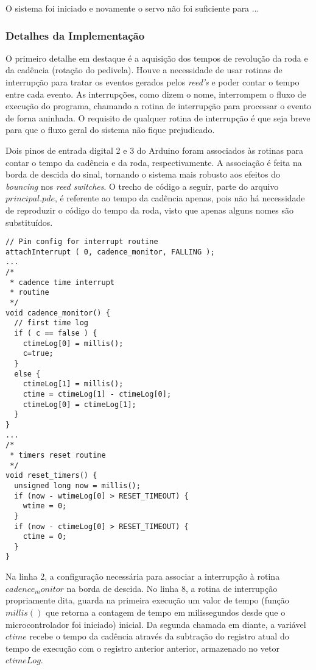 \documentclass[a4paper,11pt]{article}
\begin{document}
O sistema foi iniciado e novamente o servo não foi suficiente para ...

\subsubsection{Detalhes da Implementação}
\label{sec:code_detail}
O primeiro detalhe em destaque é a aquisição dos tempos de revolução da roda e
da cadência (rotação do pedivela). Houve a necessidade de usar rotinas de
interrupção para tratar os eventos gerados pelos \textit{reed's} e poder contar
o tempo entre cada evento. As interrupções, como dizem o nome, interrompem o
fluxo de execução do programa, chamando a rotina de interrupção para processar
o evento de forna aninhada. O requisito de qualquer rotina de interrupção é que
seja breve para que o fluxo geral do sistema não fique prejudicado.

Dois pinos de entrada digital 2 e 3 do Arduino foram associados às
rotinas para contar o tempo da cadência e da roda, respectivamente. A
associação é feita na borda de descida do sinal, tornando o sistema mais
robusto aos efeitos do \textit{bouncing} nos \textit{reed switches}. O
trecho de código a seguir, parte do arquivo $principal.pde$, é referente ao
tempo da cadência apenas, pois não há necessidade de reproduzir o código do
tempo da roda, visto que apenas alguns nomes são substituídos.
\begin{lstlisting}
// Pin config for interrupt routine
attachInterrupt ( 0, cadence_monitor, FALLING );
...
/*
 * cadence time interrupt
 * routine
 */
void cadence_monitor() {
  // first time log
  if ( c == false ) {
    ctimeLog[0] = millis();
    c=true;
  }
  else {
    ctimeLog[1] = millis();
    ctime = ctimeLog[1] - ctimeLog[0];
    ctimeLog[0] = ctimeLog[1];
  }
}
...
/*
 * timers reset routine
 */
void reset_timers() {
  unsigned long now = millis();
  if (now - wtimeLog[0] > RESET_TIMEOUT) {
    wtime = 0;
  }
  if (now - ctimeLog[0] > RESET_TIMEOUT) {
    ctime = 0;
  }
}
\end{lstlisting}
Na linha 2, a configuração necessária para associar a interrupção à rotina
$cadence_monitor$ na borda de descida. No linha 8, a rotina de interrupção
propriamente dita, guarda na primeira execução um valor de tempo (função
$millis()$ que retorna a contagem de tempo em milissegundos desde que o
microcontrolador foi iniciado) inicial. Da segunda chamada em diante, a
variável $ctime$ recebe o tempo da cadência através da subtração do registro
atual do tempo de execução com o registro anterior anterior, armazenado no
vetor $ctimeLog$.
\end{document}
